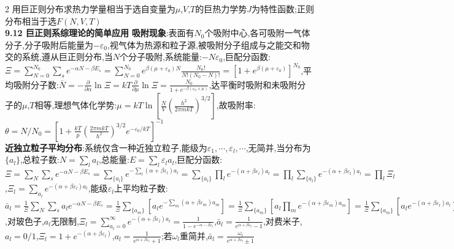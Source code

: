 \documentclass[10pt,a4paper]{article}
\begin{document}
\begin{multicols}{2}
用巨正则分布求热力学量相当于选自变量为$\mu$,$V$,$T$的巨热力学势$J$为特性函数;正则分布相当于选$F(N,V,T)$\\
\textbf{9.12 巨正则系综理论的简单应用}
\textbf{吸附现象}:表面有$N_0$个吸附中心,各可吸附一气体分子,分子吸附后能量为$-\varepsilon_0$,视气体为热源和粒子源,被吸附分子组成与之能交和物交的系统,遵从巨正则分布,当$N$个分子吸附,系统能量:$-N\varepsilon_0$,巨配分函数:$\Xi=\sum_{N=0}^{N_0}\sum_se^{-\alpha N-\beta E_s}=\sum_{N=0}^{N_0}e^{\beta(\mu+\varepsilon_0)N}\frac{N_0!}{N!(N_0-N)!}=[1+e^{\beta(\mu+\varepsilon_0)}]^{N_0}$,平均吸附分子数:$\overline{N}=-\frac{\partial}{\partial\alpha}\ln\Xi=kT\frac{\partial}{\partial\mu}\ln\Xi=\frac{N_0}{1+e^{-\beta(\varepsilon_0+\mu)}}$,达平衡时吸附和未吸附分子的$\mu$,$T$相等,理想气体化学势:$\mu=kT\ln\left[\frac{N}{V}\left(\frac{h^2}{2\pi mkT}\right)^{3/2}\right]$,故吸附率:$\theta=N/N_0=\left[1+\frac{kT}{p}\left(\frac{2\pi mkT}{h^2}\right)^{3/2}e^{-\varepsilon_0/kT}\right]^{-1}$\\
\textbf{近独立粒子平均分布}:系统仅含一种近独立粒子,能级为$\varepsilon_1,\cdots,\varepsilon_l,\cdots$,无简并,当分布为$\{a_l\}$,总粒子数:$N=\sum_la_l$,总能量:$E=\sum_l\varepsilon_la_l$,巨配分函数:$\Xi=\sum_N\sum_se^{-\alpha N-\beta E_s}=\sum_{\{a_l\}}e^{-\sum_l(\alpha+\beta\varepsilon_l)a_l}=\sum_{\{a_l\}}\prod_le^{-(\alpha+\beta\varepsilon_l)a_l}=\prod_l\sum_{\{a_l\}}e^{-(\alpha+\beta\varepsilon_l)a_l}=\prod_l\Xi_l$,$\Xi_l=\sum_{a_l}e^{-(\alpha+\beta\varepsilon_l)a_l}$,能级$\varepsilon_l$上平均粒子数:$\bar{a}_l=\frac{1}{\Xi}\sum_N\sum_sa_le^{-\alpha N-\beta E_s}=\frac{1}{\Xi}\sum_{\{a_m\}}\left[a_le^{-\sum_m(\alpha+\beta\varepsilon_m)a_m}\right]=\frac{1}{\Xi}\sum_{\{a_m\}}\left[a_l\prod_me^{-(\alpha+\beta\varepsilon_m)a_m}\right]=\frac{1}{\Xi}\sum_{\{a_m\}}\left[a_le^{-(\alpha+\beta\varepsilon_l)a_l}\prod_{m\neq l}e^{-(\alpha+\beta\varepsilon_m)a_m}\right]=\frac{1}{\Xi}\left[\sum_{a_l}a_le^{-(\alpha+\beta\varepsilon_l)a_l}\right]\prod_{m\neq l}\left[\sum_{a_m}e^{-(\alpha+\beta\varepsilon_m)a_m}\right]=\frac{1}{\Xi_l}\sum_{a_l}a_le^{-(\alpha+\beta\varepsilon_l)a_l}=\frac{1}{\Xi_l}\left(-\frac{\partial}{\partial\alpha}\right)\Xi_l=-\frac{\partial}{\partial\alpha}\ln\Xi_l$,对玻色子,$a_l$无限制,$\Xi_l=\sum_{a_l=0}^{\infty}e^{-(\alpha+\beta\varepsilon_l)a_l}=\frac{1}{1-e^{-\alpha-\beta\varepsilon_l}}$,$\bar{a}_l=\frac{1}{e^{\alpha+\beta\varepsilon_l}-1}$,对费米子,$a_l=0/1$,$\Xi_l=1+e^{-(\alpha+\beta\varepsilon_l)}$,$a_l=\frac{1}{e^{\alpha+\beta\varepsilon_l}+1}$;若$\omega_l$重简并,$\bar{a}_l=\frac{\omega_l}{e^{\alpha+\beta\varepsilon_l}\pm1}$\\

\end{multicols}
\end{document}
